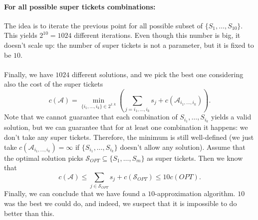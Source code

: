 \documentclass[11pt]{article}
\begin{document}
    \paragraph*{For all possible super tickets combinations:} The idea is to iterate the previous point for all possible subset of $\{S_1,\dots,S_{10}\}$. This yields $2^{10}=1024$ different iterations. Even though this number is big, it doesn't scale up: the number of super tickets is not a parameter, but it is fixed to be $10$.\\\\
    Finally, we have $1024$ different solutions, and we pick the best one considering also the cost of the super tickets
    \begin{equation*}
        c(\mathcal{A}) = \min_{\{i_1,\dots,i_k\} \in 2^{1:k}} \left(\sum_{j = i_1,\dots,i_k}s_{j} + c(\mathcal{A}_{i_1,\dots, i_k})\right).
    \end{equation*}
    Note that we cannot guarantee that each combination of $S_{i_1}, \dots, S_{i_k}$ yields a valid solution, but we can guarantee that for at least one combination it happens: we don't take any super tickets. Therefore, the minimum is still well-defined (we just take $c(\mathcal{A}_{i_1,\dots, i_k}) = \infty$ if $\{S_{i_1},\dots,S_{i_k}\}$ doesn't allow any solution). Assume that the optimal solution picks $\mathcal{S}_{OPT}\subseteq \{S_1,\dots,S_m\}$ as super tickets. Then we know that
    \begin{equation*}
        c(\mathcal{A}) \leq \sum_{j\in \mathcal{S}_{OPT}}s_{j} +c(\mathcal{S}_{OPT}) \leq 10 c(OPT).
    \end{equation*}
    Finally, we can conclude that we have found a $10$-approximation algorithm. $10$ was the best we could do, and indeed, we suspect that it is impossible to do better than this. 
    
\end{document}
